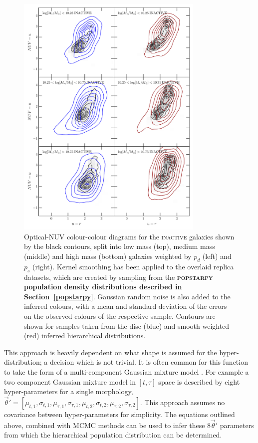 \begin{figure}
\begin{centering}
\includegraphics[width=0.8\textwidth]{starpy/figc3b.pdf}
\caption[Replica colour-colour distributions using the \textsc{popstarpy} method]{Optical-NUV colour-colour diagrams for the \textsc{inactive} galaxies shown by the black contours, split into low mass (top), medium mass (middle) and high mass (bottom) galaxies weighted by $p_d$ (left) and $p_s$ (right). Kernel smoothing has been applied to the overlaid replica datasets, which are created by sampling from the \textbf{\textsc{popstarpy} population density distributions described in Section~\ref{popstarpy}}. Gaussian random noise is also added to the inferred colours, with a mean and standard deviation of the errors on the observed colours of the respective sample. Contours are shown for samples taken from the disc (blue) and smooth weighted (red) inferred hierarchical distributions.}
\label{replicapop}
\end{centering}
\end{figure}

This approach is heavily dependent on what shape is assumed for the hyper-distribution; a decision which is not trivial. It is often common for this function to take the form of a multi-component Gaussian mixture model \citep{mackay03, lahav00}. For example a two component Gaussian mixture model in $[t, \tau]$ space is described by eight hyper-parameters for a single morphology, $\vec{\theta}' = [\mu_{t,1}, \sigma_{t,1}, \mu_{\tau,1}, \sigma_{\tau,1}, \mu_{t,2}, \sigma_{t,2}, \mu_{\tau,2}, \sigma_{\tau,2}]$. This approach assumes no covariance between hyper-parameters for simplicity. The equations outlined above, combined with MCMC methods can be used to infer these $8 \vec{\theta}'$ parameters from which the hierarchical population distribution can be determined. 

